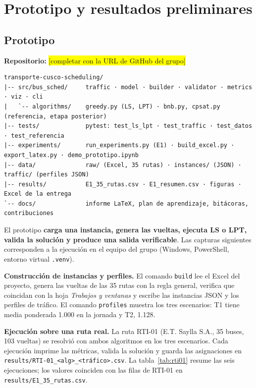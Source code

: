\section{Prototipo y resultados preliminares}\label{sec:resultados}

\subsection{Prototipo}
\textbf{Repositorio:} \colorbox{yellow}{[completar con la URL de GitHub del grupo]}

\begin{lstlisting}
transporte-cusco-scheduling/
|-- src/bus_sched/     traffic · model · builder · validator · metrics · viz · cli
|   `-- algorithms/    greedy.py (LS, LPT) · bnb.py, cpsat.py (referencia, etapa posterior)
|-- tests/             pytest: test_ls_lpt · test_traffic · test_datos · test_referencia
|-- experiments/       run_experiments.py (E1) · build_excel.py · export_latex.py · demo_prototipo.ipynb
|-- data/              raw/ (Excel, 35 rutas) · instances/ (JSON) · traffic/ (perfiles JSON)
|-- results/           E1_35_rutas.csv · E1_resumen.csv · figuras · Excel de la entrega
`-- docs/              informe LaTeX, plan de aprendizaje, bitácoras, contribuciones
\end{lstlisting}

El prototipo \textbf{carga una instancia, genera las vueltas, ejecuta LS o LPT, valida la solución y produce una salida verificable}. Las capturas siguientes corresponden a la ejecución en el equipo del grupo (Windows, PowerShell, entorno virtual \texttt{.venv}).

\textbf{Construcción de instancias y perfiles.} El comando \texttt{build} lee el Excel del proyecto, genera las vueltas de las 35 rutas con la regla general, verifica que coincidan con la hoja \emph{Trabajos y ventanas} y escribe las instancias JSON y los perfiles de tráfico. El comando \texttt{profiles} muestra los tres escenarios: T1 tiene media ponderada 1.000 en la jornada y T2, 1.128.



\textbf{Ejecución sobre una ruta real.} La ruta RTI-01 (E.T. Saylla S.A., 35 buses, 103 vueltas) se resolvió con ambos algoritmos en los tres escenarios. Cada ejecución imprime las métricas, valida la solución y guarda las asignaciones en \texttt{results/RTI-01\_<alg>\_<tráfico>.csv}. La tabla~\ref{tab:rti01} resume las seis ejecuciones; los valores coinciden con las filas de RTI-01 en \texttt{results/E1\_35\_rutas.csv}.

